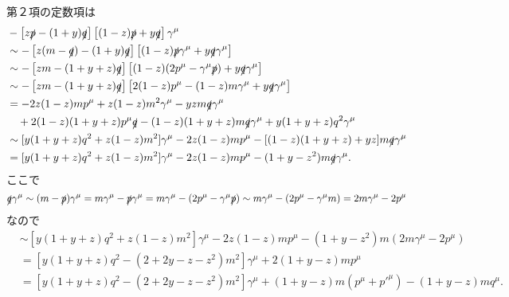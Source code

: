 第２項の定数項は
\begin{align*}
  & - \left[ z \slashed{p} - (1+y) \slashed{q} \right] \left[ (1-z) \slashed{p} + y\slashed{q} \right] \gamma^\mu \\
  &\sim - \left[ z (m-\slashed{q}) - (1+y) \slashed{q} \right] \left[ (1-z) \slashed{p} \gamma^\mu + y\slashed{q} \gamma^\mu \right] \\
  &\sim - \left[ zm - (1+y+z) \slashed{q} \right] \left[ (1-z) (2p^\mu - \gamma^\mu \slashed{p}) + y\slashed{q} \gamma^\mu \right] \\
  &\sim - \left[ zm - (1+y+z) \slashed{q} \right] \left[ 2(1-z)p^\mu - (1-z)m \gamma^\mu + y\slashed{q} \gamma^\mu \right] \\
  &= -2z(1-z)m p^\mu + z(1-z)m^2 \gamma^\mu - yzm \slashed{q} \gamma^\mu \\
  &\quad + 2(1-z)(1+y+z) p^\mu \slashed{q} - (1-z)(1+y+z)m \slashed{q} \gamma^\mu + y (1+y+z) q^2 \gamma^\mu \\
  &\sim [y (1+y+z) q^2 + z(1-z)m^2] \gamma^\mu - 2z(1-z)m p^\mu - [(1-z)(1+y+z) + yz] m \slashed{q} \gamma^\mu \\
  &= [y (1+y+z) q^2 + z(1-z)m^2] \gamma^\mu - 2z(1-z)m p^\mu - (1+y-z^2) m \slashed{q} \gamma^\mu .
\end{align*}
ここで
\[
\slashed{q} \gamma^\mu \sim (m - \slashed{p}) \gamma^\mu = m \gamma^\mu - \slashed{p} \gamma^\mu
= m \gamma^\mu - (2p^\mu - \gamma^\mu \slashed{p}) \sim m \gamma^\mu - (2p^\mu - \gamma^\mu m)
= 2 m \gamma^\mu - 2p^\mu
\]
なので
\begin{align*}
  &\sim [y (1+y+z) q^2 + z(1-z)m^2] \gamma^\mu - 2z(1-z)m p^\mu - (1+y-z^2) m (2 m \gamma^\mu - 2p^\mu) \\
  &= [y (1+y+z) q^2 - (2+2y-z-z^2) m^2] \gamma^\mu + 2(1+y-z) m p^\mu \\
  &= [y (1+y+z) q^2 - (2+2y-z-z^2) m^2] \gamma^\mu + (1+y-z) m (p^\mu+p'^\mu) - (1+y-z)m q^\mu .
\end{align*}

